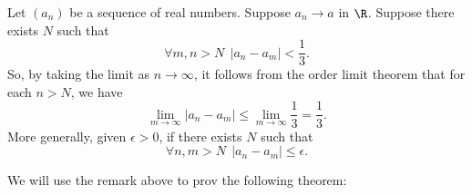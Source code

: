  \begin{remark}\label{Useful Observation}
    Let \( ({a}_{n}) \) be a sequence of real numbers. Suppose \( {a}_{n} \to a  \) in \( \R  \). Suppose there exists \( N \) such that  
    \[  \forall m, n > N  \ \ | {a}_{n} - {a}_{m} | < \frac{ 1 }{ 3 }. \]
    So, by taking the limit as \( n \to \infty   \), it follows from the order limit theorem that for each \( n > N  \), we have 
    \[  \lim_{ m \to \infty  }  | {a}_{n} - {a}_{m} |  \leq \lim_{ m \to \infty  }  \frac{ 1 }{ 3 } = \frac{ 1 }{ 3 }. \]
    More generally, given \( \epsilon > 0  \), if there exists \( N  \) such that
    \[  \forall n,m > N \ \ | {a}_{n} - {a}_{m} |  \leq \epsilon. \]
 \end{remark}

 We will use the remark above to prov the following theorem: 

